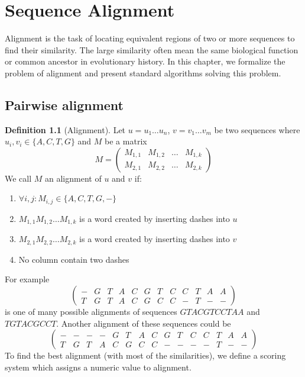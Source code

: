 \chapter{Sequence Alignment}

\label{kap:alignment} %

Alignment is the task of locating equivalent regions of two or more sequences to find their similarity.
The large similarity often mean the same biological function or common ancestor in evolutionary history.
In this chapter, we formalize the problem of alignment and present standard algorithms
solving this problem.

\section{Pairwise alignment}

\theoremstyle{definition}
\newtheorem{definition}{Definition}[section]
\theoremstyle{definition}
\begin{definition}[Alignment]
Let $u=u_1 \dots u_n$, $v=v_1 \dots v_m$ be two sequences where $u_i,v_i\in \{A, C, T, G\}$ and $M$ be a matrix
$$M=
\begin{pmatrix}
  M_{1,1} & M_{1,2} & \dots & M_{1,k} \\
  M_{2,1} & M_{2,2} & \dots & M_{2,k}
\end{pmatrix}$$
We call $M$ an alignment of $u$ and $v$ if:
\begin{enumerate}
\item $\forall i,j : M_{i,j}\in \{A,C,T,G,-\}$
\item $M_{1,1} M_{1,2} \dots M_{1,k}$ is a word created by inserting dashes into $u$
\item $M_{2,1} M_{2,2} \dots M_{2,k}$ is a word created by inserting dashes into $v$
\item No column contain two dashes
\end{enumerate}
\end{definition}

For example 
\setlength{\arraycolsep}{1pt}
\setcounter{MaxMatrixCols}{20}
$$
\begin{pmatrix}
   - & G & T & A & C & G & T & C & C & T & A & A \\
   T & G & T & A & C & G & C & C & - & T & - & -
\end{pmatrix}$$
is one  of many possible alignments of sequences $GTACGTCCTAA$ and $TGTACGCCT$.
Another alignment of these sequences could be 
$$\begin{pmatrix}
   -&-&-&-&G&T&A&C&G&T&C&C&T&A&A \\
   T&G&T&A&C&G&C&C&-&-&-&-&T&-&-
\end{pmatrix}$$
To find the best alignment (with most of the similarities), we define a scoring system which assigns a numeric value to alignment.

